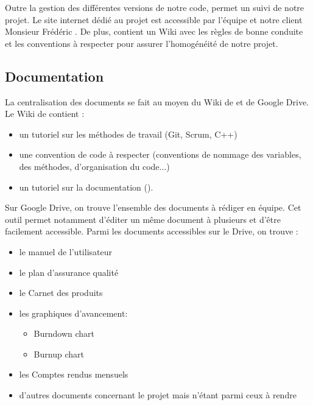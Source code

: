 Outre la gestion des différentes versions de notre code,  permet un suivi de notre projet. Le site internet  dédié au projet est accessible par l’équipe et notre client Monsieur Frédéric . 
De plus,  contient un Wiki avec les règles de bonne conduite et les conventions à respecter pour assurer l'homogénéité de notre projet. 

\subsection{Documentation}
La centralisation des documents se fait au moyen du Wiki de  et de Google Drive. 
Le Wiki de  contient :
\begin{itemize}
	\item un tutoriel sur les méthodes de travail (Git, Scrum, C++)
	\item une convention de code à respecter (conventions de nommage des variables, des méthodes, d’organisation du code...)
	\item un tutoriel sur la documentation ().
\end{itemize}

Sur Google Drive, on trouve l’ensemble des documents à rédiger en équipe. Cet outil permet notamment d’éditer un même document à plusieurs et d’être facilement accessible. Parmi les documents accessibles sur le Drive, on trouve :
\begin{itemize}
	\item le manuel de l’utilisateur
	\item le plan d'assurance qualité
	\item le Carnet des produits 
	\item les graphiques d’avancement:
	\begin{itemize}
		\item Burndown chart
		\item Burnup chart
	\end{itemize}
	\item les Comptes rendus mensuels
	\item d’autres documents concernant le projet mais n’étant parmi ceux à rendre
\end{itemize}
 
